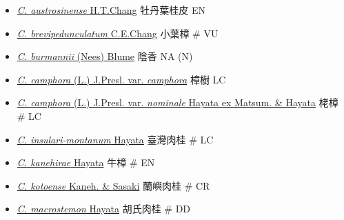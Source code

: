 \begin{itemize}
  \begin{itemize}
        \item[] \href{http://www.theplantlist.org/tpl1.1/search?q=Cinnamomum+austrosinense}{\textit{C. austrosinense} H.T.Chang}   牡丹葉桂皮   EN
        \item[] \href{http://www.theplantlist.org/tpl1.1/search?q=Cinnamomum+brevipedunculatum}{\textit{C. brevipedunculatum} C.E.Chang}   小葉樟  \# VU
        \item[] \href{http://www.theplantlist.org/tpl1.1/search?q=Cinnamomum+burmannii}{\textit{C. burmannii} (Nees) Blume}   陰香   NA (N)
        \item[] \href{http://www.theplantlist.org/tpl1.1/search?q=Cinnamomum+camphora+var.+camphora}{\textit{C. camphora} (L.) J.Presl. var. \textit{camphora}}   樟樹   LC
        \item[] \href{http://www.theplantlist.org/tpl1.1/search?q=Cinnamomum+camphora+var.+nominale}{\textit{C. camphora} (L.) J.Presl. var. \textit{nominale} Hayata ex Matsum. \& Hayata}   栳樟  \# LC
        \item[] \href{http://www.theplantlist.org/tpl1.1/search?q=Cinnamomum+insulari-montanum}{\textit{C. insulari-montanum} Hayata}   臺灣肉桂  \# LC
        \item[] \href{http://www.theplantlist.org/tpl1.1/search?q=Cinnamomum+kanehirae}{\textit{C. kanehirae} Hayata}   牛樟  \# EN
        \item[] \href{http://www.theplantlist.org/tpl1.1/search?q=Cinnamomum+kotoense}{\textit{C. kotoense} Kaneh. \& Sasaki}   蘭嶼肉桂  \# CR
        \item[] \href{http://www.theplantlist.org/tpl1.1/search?q=Cinnamomum+macrostemon}{\textit{C. macrostemon} Hayata}   胡氏肉桂  \# DD

\end{itemize}
\end{itemize}
